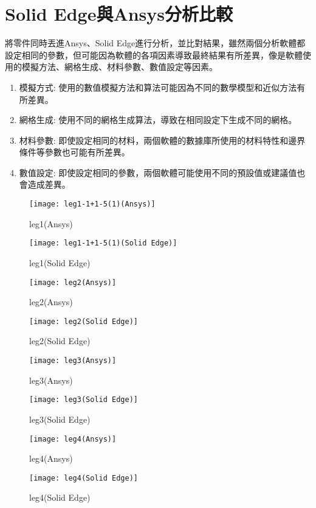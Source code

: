 \section{Solid Edge與Ansys分析比較}
將零件同時丟進Ansys、Solid Edge進行分析，並比對結果，雖然兩個分析軟體都設定相同的參數，但可能因為軟體的各項因素導致最終結果有所差異，像是軟體使用的模擬方法、網格生成、材料參數、數值設定等因素。\
\begin{enumerate}
\item 模擬方式: 使用的數值模擬方法和算法可能因為不同的數學模型和近似方法有所差異。
\item 網格生成: 使用不同的網格生成算法，導致在相同設定下生成不同的網格。
\item 材料參數: 即使設定相同的材料，兩個軟體的數據庫所使用的材料特性和邊界條件等參數也可能有所差異。
\item	數值設定: 即使設定相同的參數，兩個軟體可能使用不同的預設值或建議值也會造成差異。
\end{enumerate}
\begin{figure}[hbt!]
\center
\texttt{[image: leg1-1+1-5(1)(Ansys)]}
\caption{\Large leg1(Ansys)}\label{leg1-1+1-5(1)(Ansys)}
\end{figure}
\begin{figure}[hbt!]
\center
\texttt{[image: leg1-1+1-5(1)(Solid Edge)]}
\caption{\Large leg1(Solid Edge)}\label{leg1-1+1-5(1)(Solid Edge)}
\end{figure}
\begin{figure}[hbt!]
\center
\texttt{[image: leg2(Ansys)]}
\caption{\Large leg2(Ansys)}\label{leg2(Ansys)}
\end{figure}
\begin{figure}[hbt!]
\center
\texttt{[image: leg2(Solid Edge)]}
\caption{\Large leg2(Solid Edge)}\label{leg2(Solid Edge)}
\end{figure}
\begin{figure}[hbt!]
\center
\texttt{[image: leg3(Ansys)]}
\caption{\Large leg3(Ansys)}\label{leg3(Ansys)}
\end{figure}
\begin{figure}[hbt!]
\center
\texttt{[image: leg3(Solid Edge)]}
\caption{\Large leg3(Solid Edge)}\label{leg3(Solid Edge)}
\end{figure}
\begin{figure}[hbt!]
\center
\texttt{[image: leg4(Ansys)]}
\caption{\Large leg4(Ansys)}\label{leg4(Ansys)}
\end{figure}
\begin{figure}[hbt!]
\center
\texttt{[image: leg4(Solid Edge)]}
\caption{\Large leg4(Solid Edge)}\label{leg4(Solid Edge)}
\end{figure}
\newpage
